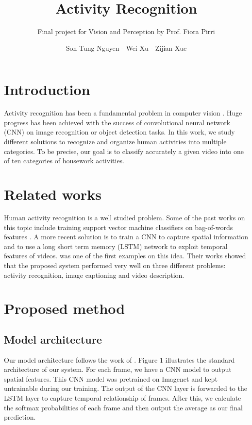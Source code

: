 \documentclass{scrartcl}
\begin{document}
\title{Activity Recognition}
\subtitle{Final project for Vision and Perception by Prof. Fiora Pirri}
\author{Son Tung Nguyen - Wei Xu - Zijian Xue}

\maketitle

\section{Introduction}
Activity recognition has been a fundamental problem in computer vision \cite{a1}.
Huge progress has been achieved with the success of convolutional neural network
(CNN) on image recognition or object detection tasks. In this work, we study
different solutions to recognize and organize human activities into multiple
categories. To be precise, our goal is to classify accurately a given video into
one of ten categories of housework activities.
\section{Related works}
Human activity recognition is a well studied problem. Some of the past works on
this topic include training support vector machine classifiers on bag-of-words
features \cite{a2, a3}. A more recent solution is to train a CNN to capture spatial
information and to use a long short term memory (LSTM) network to exploit temporal
features of videos. \cite{a1} was one of the first examples on this idea. Their works
showed that the proposed system performed very well on three different problems:
activity recognition, image captioning and video description.


\section{Proposed method}

\subsection{Model architecture}
Our model architecture follows the work of \cite{a1}. Figure 1 illustrates the standard architecture
of our system. For each frame, we have a CNN model to output spatial
features. This CNN model was pretrained on Imagenet and kept untrainable during
our training. The output of the CNN layer is forwarded to the LSTM layer to capture
temporal relationship of frames. After this, we calculate the softmax probabilities
of each frame and then output the average as our final prediction.
\end{document}
